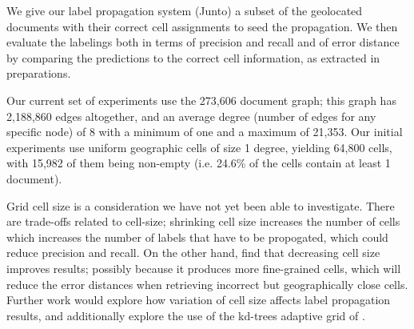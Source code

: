\par 
We give our label propagation system (Junto) a subset of the geolocated
documents with their correct cell assignments to seed the propagation. We then
evaluate the labelings both in terms of precision and recall and of error
distance by comparing the predictions to the correct cell information, as
extracted in preparations.

\par %
Our current set of experiments use the 273,606
document graph; this graph has  2,188,860 edges altogether, and an average
degree (number of edges for any  specific node) of 8 with a minimum of one and
a maximum of 21,353. Our initial  experiments use uniform geographic cells of
size 1 degree, yielding 64,800  cells, with 15,982 of them being non-empty
(i.e. 24.6\% of the cells contain at  least 1 document).

\par
Grid cell size is a consideration we have not yet been able to investigate.
There are trade-offs related to cell-size; shrinking cell size increases the
number of cells which increases the number of labels that have to be
propogated, which could reduce precision and recall. On the other hand,
\cite{wing-baldridge:11} find that decreasing cell size improves results;
possibly because it produces more fine-grained cells, which will reduce the
error distances when retrieving incorrect but geographically close cells.
Further work would explore how variation of cell size affects label propagation
results, and additionally explore the use of the kd-trees adaptive grid of
\cite{rolleretal:12}.


